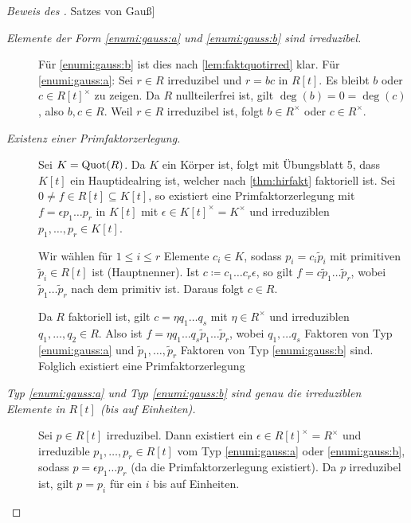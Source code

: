 \documentclass[12pt,a4paper]{scrartcl}
\begin{document}
\newcommand{\hyperhyper}[2]{\hyperref[#1]{#2}}
\begin{proof}[Beweis des \hyperhyper{thm:gauss}{Satzes von Gauß}] %
	\leavevmode
	\begin{description}
		\item[\emph{Elemente der Form \ref{enumi:gauss:a} und \ref{enumi:gauss:b} sind irreduzibel.}] Für \ref{enumi:gauss:b} ist dies nach \cref{lem:faktquotirred} klar. Für \ref{enumi:gauss:a}: Sei $r\in R$ irreduzibel und $r = bc$ in $R[t]$. Es bleibt $b$ oder $c\in R[t]^{\times}$ zu zeigen. Da $R$ nullteilerfrei ist, gilt $\deg (b) = 0  =\deg (c)$, also $b,c\in R$. Weil $r\in R$ irreduzibel ist, folgt $b\in R^{\times}$ oder $c\in R^{\times}$.
		
		\item[\emph{Existenz einer Primfaktorzerlegung.}] Sei $K = \operatorname{Quot}(R)$. Da $K$ ein Körper ist, folgt mit Übungsblatt 5, dass $K[t]$ ein Hauptidealring ist, welcher nach \cref{thm:hirfakt} faktoriell ist. Sei $0\neq f\in R[t]\subseteq K[t]$, so existiert eine Primfaktorzerlegung mit $f = \epsilon p_1\dots p_r$ in $K[t]$ mit $\epsilon\in K[t]^{\times} = K^{\times}$ und irreduziblen $p_1,\dots,p_r\in K[t]$.
		
		Wir wählen für $1\leq i\leq r$ Elemente $c_i\in K$, sodass $p_i = c_i\tilde p_i$ mit primitiven $\tilde p_i\in R[t]$ ist (\glqq Hauptnenner\grqq). Ist $c \coloneqq c_1\dots c_r\epsilon$, so gilt $f = c\tilde p_1\dots \tilde p_r$, wobei $\tilde p_1\dots\tilde p_r$ nach dem  primitiv ist. Daraus folgt $c\in R$.
		
		Da $R$ faktoriell ist, gilt $c = \eta q_1\dots q_s$ mit $\eta\in R^{\times}$ und irreduziblen $q_1,\dots,q_2\in R$. Also ist $f = \eta q_1\dots q_s\tilde p_1\dots \tilde p_r$, wobei $q_1,\dots q_s$ Faktoren von Typ \ref{enumi:gauss:a} und $\tilde p_1,\dots, \tilde p_r$ Faktoren von Typ \ref{enumi:gauss:b} sind. Folglich existiert eine Primfaktorzerlegung
		
		\item[\emph{Typ \ref{enumi:gauss:a} und Typ \ref{enumi:gauss:b} sind genau die irreduziblen Elemente in $R[t]$ (bis auf Einheiten).}] Sei $p\in R[t]$ irreduzibel. Dann existiert ein $\epsilon \in R[t]^{\times} = R^{\times}$ und irreduzible $p_1,\dots,p_r\in R[t]$ vom Typ \ref{enumi:gauss:a} oder \ref{enumi:gauss:b}, sodass $p = \epsilon p_1\dots p_r$ (da die Primfaktorzerlegung existiert). Da $p$ irreduzibel ist, gilt $p = p_i$ für ein $i$ bis auf Einheiten.
		

\end{description}
\end{proof}
\end{document}

